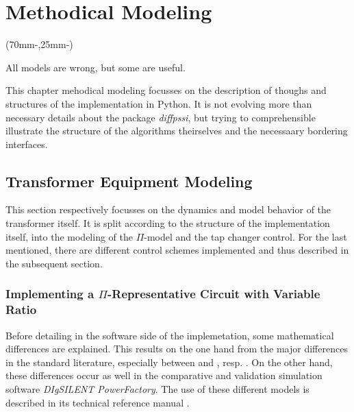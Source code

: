 
\chapter{Methodical Modeling}
\label{chap:methodical-modeling}

\begin{textblock*}{.7\textwidth}(70mm-\offset,25mm-\offset)
        \begin{fquote}
            All models are wrong, but some are useful.
        \end{fquote}
\end{textblock*}

This chapter mehodical modeling focusses on the description of thoughs and structures of the implementation in Python.
It is not evolving more than necessary details about the package {\itshape diffpssi}, but trying to comprehensible illustrate the structure of the algorithms theirselves and the necessaary bordering interfaces.

\section{Transformer Equipment Modeling}
\label{sec:transformer-modeling}

This section respectively focusses on the dynamics and model behavior of the transformer itself.
It is split according to the structure of the implementation itself, into the modeling of the $\Pi$-model and the tap changer control.
For the last mentioned, there are different control schemes implemented and thus described in the subsequent section.

\subsection{Implementing a $\Pi$-Representative Circuit with Variable Ratio}

Before detailing in the software side of the implemetation, some mathematical differences are explained.
This results on the one hand from the major differences in the standard literature, especially between \textcite{machowski_2020} and \textcite{kundur_2022}, resp. \textcite{milano_2010}.
On the other hand, these differences occur as well in the comparative and validation simulation software \textit{DIgSILENT PowerFactory}.
The use of these different models is described in its technical reference manual \quelle. 

